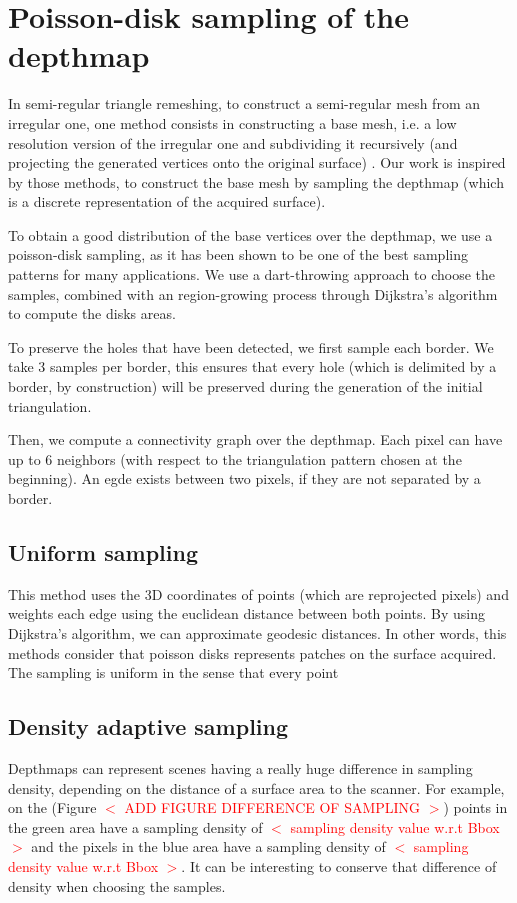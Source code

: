 \documentclass[11pt,fleqn]{book} %
\newcommand{\arnaud}[1]{\textcolor{red}{$<$ #1 $>$}}
\begin{document}
\section{Poisson-disk sampling of the depthmap}
\label{sec:poisson_sampling}

In semi-regular triangle remeshing, to construct a semi-regular mesh from an irregular one, one method consists in constructing a base mesh, i.e. a low resolution version of the irregular one and subdividing it recursively (and projecting the generated vertices onto the original surface) \cite{PRS15}. Our work is inspired by those methods, to construct the base mesh by sampling the depthmap (which is a discrete representation of the acquired surface).

To obtain a good distribution of the base vertices over the depthmap, we use a poisson-disk sampling, as it has been shown to be one of the best sampling patterns for many applications. 
We use a dart-throwing approach to choose the samples, combined with an region-growing process through Dijkstra's algorithm \cite{Dij59} to compute the disks areas.

To preserve the holes that have been detected, we first sample each border. We take 3 samples per border, this ensures that every hole (which is delimited by a border, by construction) will be preserved during the generation of the initial triangulation.

Then, we compute a connectivity graph over the depthmap. Each pixel can have up to 6 neighbors (with respect to the triangulation pattern chosen at the beginning). An egde exists between two pixels, if they are not separated by a border.

\subsection{Uniform sampling}
This method uses the 3D coordinates of points (which are reprojected pixels) and weights each edge using the euclidean distance between both points.
By using Dijkstra's algorithm, we can approximate geodesic distances. In other words, this methods consider that poisson disks represents patches on the surface acquired.
The sampling is uniform in the sense that every point 

\subsection{Density adaptive sampling}
Depthmaps can represent scenes having a really huge difference in sampling density, depending on the distance of a surface area to the scanner. 
For example, on the (Figure \arnaud{ADD FIGURE DIFFERENCE OF SAMPLING}) points in the green area have a sampling density of \arnaud{sampling density value w.r.t Bbox} and the pixels in the blue area have a sampling density of \arnaud{sampling density value w.r.t Bbox}. It can be interesting to conserve that difference of density when choosing the samples.
\end{document}
